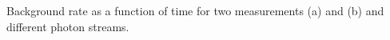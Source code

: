 \label{fig:bg_timetrace} Background rate as a function of time for two measurements (a) and (b) and different photon streams.